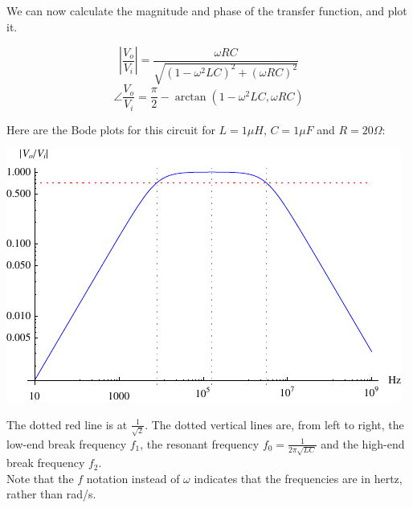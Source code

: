 \documentclass[12pt,a4paper]{report}
\begin{document}
We can now calculate the magnitude and phase of the transfer function, and plot it.

\[ \left| \frac{V_o}{V_i} \right| = \frac{\omega RC}{\sqrt{(1 - \omega^2 LC)^2 + (\omega RC)^2}} \]
\[ \angle \frac{V_o}{V_i} = \frac{\pi}{2} - \arctan{(1 - \omega^2 LC, \omega RC)} \]

Here are the Bode plots for this circuit for $L = 1 \mu H$, $C = 1 \mu F$ and $R = 20 \Omega$:

\includegraphics[scale=1.75]{Graphics/bpf_magnitude_plot}

The dotted red line is at $\displaystyle \frac{1}{\sqrt{2}}$. The dotted vertical lines are, from left to right, the low-end break frequency $f_1$, the resonant frequency $\displaystyle f_0 = \frac{1}{2\pi \sqrt{LC}}$ and the high-end break frequency $f_2$.\\
Note that the $f$ notation instead of $\omega$ indicates that the frequencies are in hertz, rather than rad/s.

\begin{comment}

LogLinearPlot[{(\[Pi]/2 - 
     ArcTan[1 - (\[Omega]*2*Pi)^2 L c, (\[Omega]*2*
         Pi) R c])*(180/\[Pi]), 45, -45, 0}, {\[Omega], 10, 10^9}, 
 PlotStyle -> {Blue, {Red, Dotted}, {Red, Dotted}, {Red, Dotted}}, 
 AxesLabel -> {Hz, "Degrees"}, GridLinesStyle -> Dotted, 
 PlotRange -> Full, 
 Ticks -> {Automatic, Union[{-45, 45}, Range[90, -90, -10]]},
 GridLines -> {{3.1910*10^6, 7937.95, 1/(2*Pi*Sqrt[L*c])} , None}]
\end{comment}
\end{document}
